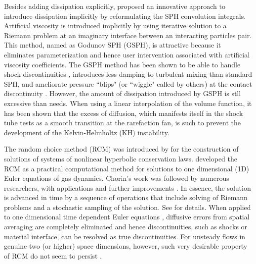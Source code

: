 Besides adding dissipation explicitly, \citet{inutsuka2002reformulation} proposed an innovative approach to introduce dissipation implicitly by reformulating the SPH convolution integrals. Artificial viscosity is introduced implicitly by using iterative solution to a Riemann problem at an imaginary interface between an interacting particles pair. This method, named as Godunov SPH (GSPH), is attractive because it eliminates parameterization and hence user intervention associated with artificial viscosity coefficients. The GSPH method has been shown to be able to handle shock discontinuities \citep{inutsuka2002reformulation, cha2003implementations,iwasaki2011smoothed, puri2014approximate}, introduces less damping to turbulent mixing \citep{cha2010kelvin, borgani2012hydrodynamic} than standard SPH, and ameliorate pressure ``blips" (or ``wiggle" called by others) at the contact discontinuity \citep{borgani2012hydrodynamic}. However, the amount of dissipation introduced by GSPH is stll excessive than needs. When using a linear interpolation of the volume function, it has been shown \citep{borgani2012hydrodynamic} that the excess of diffusion, which manifests itself in the shock tube tests as a smooth transition at the rarefaction fan, is such to prevent the development of the Kelvin-Helmholtz (KH) instability.

The random choice method (RCM) was introduced by \citet{glimm1965solutions} for the construction of solutions of systems of nonlinear hyperbolic conservation laws. \citet{chorin1976random} developed the RCM as a practical computational method for solutions to one dimensional (1D) Euler equations of gas dynamics. Chorin's work was followed by numerous researchers, with applications and further improvements \citep{sod1977numerical,concus1979numerical,colella1982glimm, freistuhler1992numerical}. In essence, the solution is advanced in time by a sequence of operations that include solving of Riemann problems and a stochastic sampling of the solution. See \citep{toro2013riemann} for details. When applied to one dimensional time dependent Euler equations \citep{colella1982glimm}, diffusive errors from spatial averaging are completely eliminated and hence discontinuities, such as shocks or material interface, can be resolved as true discontinuities.
For unsteady flows in genuine two (or higher) space dimensions, however, such very desirable property of RCM do not seem to persist \citep{colella1982glimm}.


